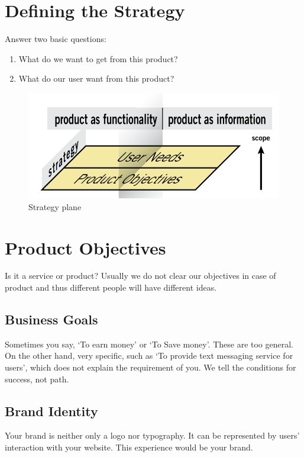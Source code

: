 \section{Defining the Strategy}
    Answer two basic questions:
    \begin{enumerate}
        \item What do we want to get from this product?
        \item What do our user want from this product?
    \end{enumerate}
    \begin{figure}
        \includegraphics[width=\linewidth]{images/pic2.png}
        \caption{Strategy plane}
    \end{figure}
\section{Product Objectives}
    Is it a service or product? Usually we do not clear our objectives in case of product and thus different people will have different ideas.
\subsection{Business Goals}
    Sometimes you say, ‘To earn money’ or ‘To Save money’. These are too general. On the other hand, very specific, such as ‘To provide text messaging service for users’, which does not explain the requirement of you. We tell the conditions for success, not path.
\subsection{Brand Identity}
    Your brand is neither only a logo nor typography. It can be represented by users’ interaction with your website. This experience would be your brand.
